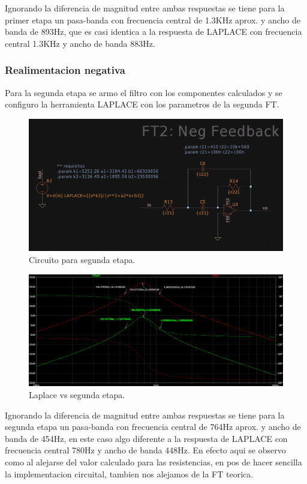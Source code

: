Ignorando la diferencia de magnitud entre ambas respuestas se tiene para la primer etapa un pasa-banda con frecuencia central de 1.3KHz aprox. y ancho de banda de 893Hz, que es casi identica a la respuesta de LAPLACE con frecuencia central 1.3KHz y ancho de banda 883Hz.

\subsubsection{Realimentacion negativa}

Para la segunda etapa se armo el filtro con los componentes calculados y se configuro la herramienta LAPLACE con los parametros de la segunda FT.

\begin{figure}[H]
    \centering
    \includegraphics[scale=.4]{Secciones/Circ1/img/schLpNeg.png}
    \caption{Circuito para segunda etapa.}
    \label{schPos}
\end{figure}

\begin{figure}[H]
    \centering
    \includegraphics[scale=.3]{Secciones/Circ1/img/lpVsNeg.png}
    \caption{Laplace vs segunda etapa.}
    \label{schPos}
\end{figure}

Ignorando la diferencia de magnitud entre ambas respuestas se tiene para la segunda etapa un pasa-banda con frecuencia central de 764Hz aprox. y ancho de banda de 454Hz, en este caso algo diferente a la respuesta de LAPLACE con frecuencia central 780Hz y ancho de banda 448Hz. En efecto aqui se observo como al alejarse del valor calculado para las resistencias, en pos de hacer sencilla la implementacion circuital, tambien nos alejamos de la FT teorica.

